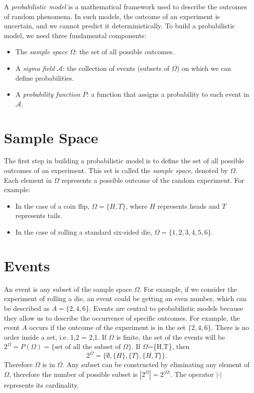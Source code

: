     A \textit{probabilistic model} is a mathematical framework used to describe the outcomes of random phenomena. In such models, the outcome of an experiment is uncertain, and we cannot predict it deterministically. To build a probabilistic model, we need three fundamental components: 
    \begin{itemize}
        \item The \textit{sample space} $\Omega$: the set of all possible outcomes.
        \item A \textit{sigma field} $\mathcal{A}$: the collection of events (subsets of $\Omega$) on which we can define probabilities.
        \item A \textit{probability function} $P$: a function that assigns a probability to each event in $\mathcal{A}$.
    \end{itemize}
    
    \section{Sample Space}
    The first step in building a probabilistic model is to define the set of all possible outcomes of an experiment. This set is called the \textit{sample space}, denoted by $\Omega$. Each element in $\Omega$ represents a possible outcome of the random experiment.
    \newline
    For example:
    \begin{itemize}
        \item In the case of a coin flip, $\Omega = \{H, T\}$, where $H$ represents heads and $T$ represents tails.
        \item In the case of rolling a standard six-sided die, $\Omega = \{1, 2, 3, 4, 5, 6\}$.
    \end{itemize}
    
    \section{Events}
    An event is any subset of the sample space $\Omega$. For example, if we consider the experiment of rolling a die, an event could be getting an even number, which can be described as $A = \{2, 4, 6\}$.\newline
    Events are central to probabilistic models because they allow us to describe the occurrence of specific outcomes. For example, the event $A$ occurs if the outcome of the experiment is in the set $\{2, 4, 6\}$. There is no order inside a set, i.e. {1,2} = {2,1}. \newline
    If $\Omega$ is finite, the set of the events will be $2^{\Omega} = P(\Omega) = \text{\{set of all the subset of $\Omega$}\}$. \newline
    If $\Omega$=\{H,T\}, then 
    \begin{equation}
        2^{\Omega} = \{\emptyset,\{H\},\{T\},\{H,T\}\}.
    \end{equation}
    Therefore $\Omega$ is in $\Omega$.\newline
    Any subset can be constructed by eliminating any element of $\Omega$, therefore the number of possible subset is $|2^{\Omega}| = 2^{|\Omega|}$. The operator $|\cdot|$ represents its cardinality. 
    

